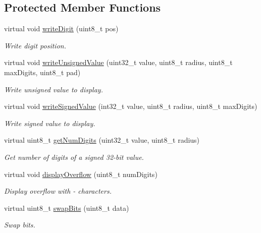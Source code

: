 \subsection*{Protected Member Functions}
\begin{DoxyCompactItemize}
\item 
virtual void \hyperlink{class_l_k_m1638_board_a186ecd4a644171428fbd93aa7f309ccb}{write\+Digit} (uint8\+\_\+t pos)
\begin{DoxyCompactList}\small\item\em Write digit position. \end{DoxyCompactList}\item 
virtual void \hyperlink{class_l_k_m1638_board_a54932b39bb7571604299d1c25d334086}{write\+Unsigned\+Value} (uint32\+\_\+t value, uint8\+\_\+t radius, uint8\+\_\+t max\+Digits, uint8\+\_\+t pad)
\begin{DoxyCompactList}\small\item\em Write unsigned value to display. \end{DoxyCompactList}\item 
virtual void \hyperlink{class_l_k_m1638_board_acacc4f02b25f985486f625af9e6edce5}{write\+Signed\+Value} (int32\+\_\+t value, uint8\+\_\+t radius, uint8\+\_\+t max\+Digits)
\begin{DoxyCompactList}\small\item\em Write signed value to display. \end{DoxyCompactList}\item 
virtual uint8\+\_\+t \hyperlink{class_l_k_m1638_board_ad56606fb7bca18eb6a3f16d45a8d294b}{get\+Num\+Digits} (uint32\+\_\+t value, uint8\+\_\+t radius)
\begin{DoxyCompactList}\small\item\em Get number of digits of a signed 32-\/bit value. \end{DoxyCompactList}\item 
virtual void \hyperlink{class_l_k_m1638_board_abaffb270a3b1baa76d15416ff6c0aa30}{display\+Overflow} (uint8\+\_\+t num\+Digits)
\begin{DoxyCompactList}\small\item\em Display overflow with -\/ characters. \end{DoxyCompactList}\item 
virtual uint8\+\_\+t \hyperlink{class_l_k_m1638_board_aef7255786ce884f881b84b6d182fbaad}{swap\+Bits} (uint8\+\_\+t data)
\begin{DoxyCompactList}\small\item\em Swap bits. \end{DoxyCompactList}\item 

\end{DoxyCompactItemize}

